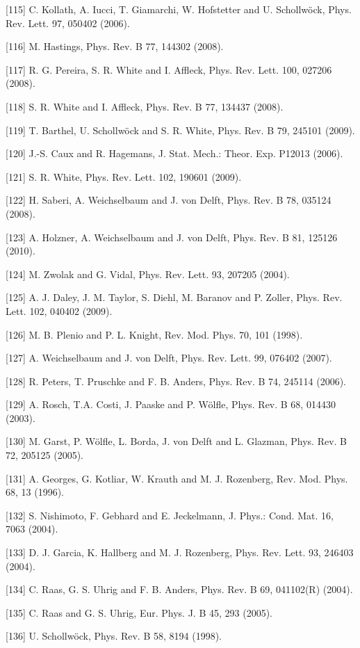 \documentclass[12pt]{article}
\begin{document}
[115] C. Kollath, A. Iucci, T. Giamarchi, W. Hofstetter and U. Schollwöck, Phys. Rev. Lett. 97, 050402 (2006).

[116] M. Hastings, Phys. Rev. B 77, 144302 (2008).

[117] R. G. Pereira, S. R. White and I. Affleck, Phys. Rev. Lett. 100, 027206 (2008).

[118] S. R. White and I. Affleck, Phys. Rev. B 77, 134437 (2008).

[119] T. Barthel, U. Schollwöck and S. R. White, Phys. Rev. B 79, 245101 (2009).

[120] J.-S. Caux and R. Hagemans, J. Stat. Mech.: Theor. Exp. P12013 (2006).

[121] S. R. White, Phys. Rev. Lett. 102, 190601 (2009).

[122] H. Saberi, A. Weichselbaum and J. von Delft, Phys. Rev. B 78, 035124 (2008).

[123] A. Holzner, A. Weichselbaum and J. von Delft, Phys. Rev. B 81, 125126 (2010).

[124] M. Zwolak and G. Vidal, Phys. Rev. Lett. 93, 207205 (2004).

[125] A. J. Daley, J. M. Taylor, S. Diehl, M. Baranov and P. Zoller, Phys. Rev. Lett. 102, 040402 (2009).

[126] M. B. Plenio and P. L. Knight, Rev. Mod. Phys. 70, 101 (1998).

[127] A. Weichselbaum and J. von Delft, Phys. Rev. Lett. 99, 076402 (2007).

[128] R. Peters, T. Pruschke and F. B. Anders, Phys. Rev. B 74, 245114 (2006).

[129] A. Rosch, T.A. Costi, J. Paaske and P. Wölfle, Phys. Rev. B 68, 014430 (2003).

[130] M. Garst, P. Wölfle, L. Borda, J. von Delft and L. Glazman, Phys. Rev. B 72, 205125 (2005).

[131] A. Georges, G. Kotliar, W. Krauth and M. J. Rozenberg, Rev. Mod. Phys. 68, 13 (1996).

[132] S. Nishimoto, F. Gebhard and E. Jeckelmann, J. Phys.: Cond. Mat. 16, 7063 (2004).

[133] D. J. Garcia, K. Hallberg and M. J. Rozenberg, Phys. Rev. Lett. 93, 246403 (2004).

[134] C. Raas, G. S. Uhrig and F. B. Anders, Phys. Rev. B 69, 041102(R) (2004).

[135] C. Raas and G. S. Uhrig, Eur. Phys. J. B 45, 293 (2005).

[136] U. Schollwöck, Phys. Rev. B 58, 8194 (1998).
\end{document}
